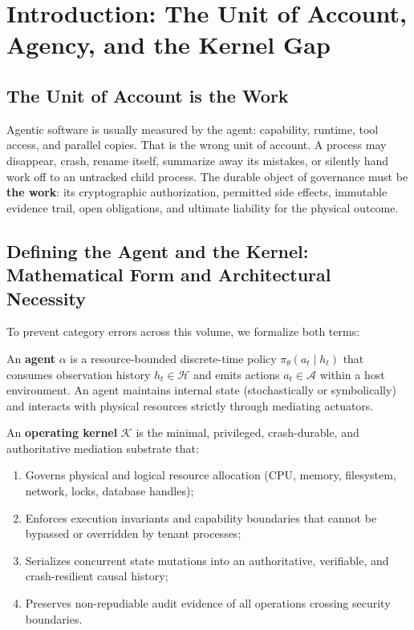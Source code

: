 \section{Introduction: The Unit of Account, Agency, and the Kernel Gap}

\subsection{The Unit of Account is the Work}

%
Agentic software is usually measured by the agent: capability, runtime, tool access, and parallel copies. That is the wrong unit of account. A process may disappear, crash, rename itself, summarize away its mistakes, or silently hand work off to an untracked child process. The durable object of governance must be \textbf{the work}: its cryptographic authorization, permitted side effects, immutable evidence trail, open obligations, and ultimate liability for the physical outcome.

\subsection{Defining the Agent and the Kernel: Mathematical Form and Architectural Necessity}

To prevent category errors across this volume, we formalize both terms:

\begin{definition}\label{def:agent}
An \textbf{agent} $\alpha$ is a resource-bounded discrete-time policy $\pi_\theta(a_t \mid h_t)$ that consumes observation history $h_t \in \mathcal{H}$ and emits actions $a_t \in \mathcal{A}$ within a host environment. An agent maintains internal state (stochastically or symbolically) and interacts with physical resources strictly through mediating actuators.
\end{definition}

\begin{definition}\label{def:kernel}
An \textbf{operating kernel} $\mathcal{K}$ is the minimal, privileged, crash-durable, and authoritative mediation substrate that:
\begin{enumerate}[leftmargin=1.5em,itemsep=1.5pt]
  \item Governs physical and logical resource allocation (CPU, memory, filesystem, network, locks, database handles);
  \item Enforces execution invariants and capability boundaries that cannot be bypassed or overridden by tenant processes;
  \item Serializes concurrent state mutations into an authoritative, verifiable, and crash-resilient causal history;
  \item Preserves non-repudiable audit evidence of all operations crossing security boundaries.
\end{enumerate}
\end{definition}

